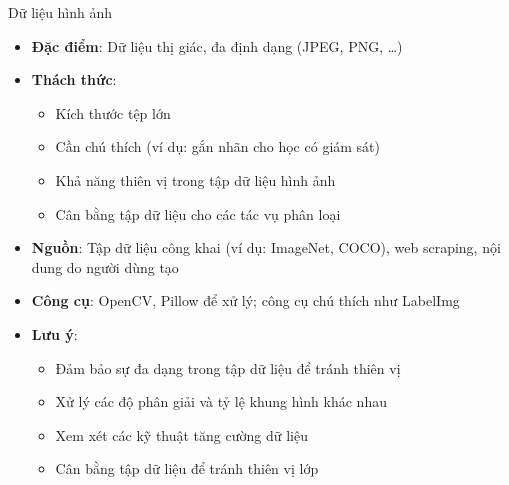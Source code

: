 \documentclass{beamer}
\begin{document}
\begin{frame}{Dữ liệu hình ảnh}
    \begin{itemize}
        \item \textbf{Đặc điểm}: Dữ liệu thị giác, đa định dạng (JPEG, PNG, \dots)
        \item \textbf{Thách thức}:
        \begin{itemize}
            \item Kích thước tệp lớn
            \item Cần chú thích (ví dụ: gắn nhãn cho học có giám sát)
            \item Khả năng thiên vị trong tập dữ liệu hình ảnh
            \item Cân bằng tập dữ liệu cho các tác vụ phân loại
        \end{itemize}
        \item \textbf{Nguồn}: Tập dữ liệu công khai (ví dụ: ImageNet, COCO), web scraping, nội dung do người dùng tạo
        \item \textbf{Công cụ}: OpenCV, Pillow để xử lý; công cụ chú thích như LabelImg
        \item \textbf{Lưu ý}:
        \begin{itemize}
            \item Đảm bảo sự đa dạng trong tập dữ liệu để tránh thiên vị
            \item Xử lý các độ phân giải và tỷ lệ khung hình khác nhau
            \item Xem xét các kỹ thuật tăng cường dữ liệu
            \item Cân bằng tập dữ liệu để tránh thiên vị lớp
        \end{itemize}
    \end{itemize}
\end{frame}
\end{document}

